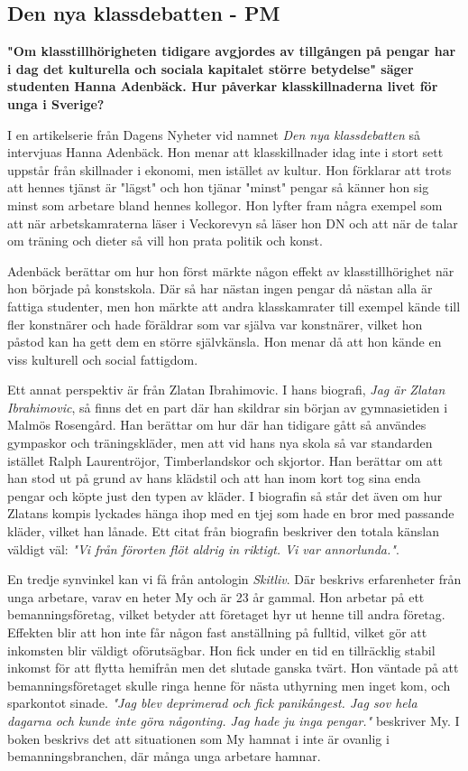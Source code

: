 \subsection{Den nya klassdebatten - PM}

\textbf{"Om klasstillhörigheten tidigare avgjordes av tillgången på pengar har i dag det kulturella och sociala kapitalet större betydelse" säger studenten Hanna Adenbäck. Hur påverkar klasskillnaderna livet för unga i Sverige?}

I en artikelserie från Dagens Nyheter vid namnet \textit{Den nya klassdebatten} så intervjuas Hanna Adenbäck. Hon menar att klasskillnader idag inte i stort sett uppstår från skillnader i ekonomi, men istället av kultur. Hon förklarar att trots att hennes tjänst är "lägst" och hon tjänar "minst" pengar så känner hon sig minst som arbetare bland hennes kollegor. Hon lyfter fram några exempel som att när arbetskamraterna läser i Veckorevyn så läser hon DN och att när de talar om träning och dieter så vill hon prata politik och konst. 

Adenbäck berättar om hur hon först märkte någon effekt av klasstillhörighet när hon började på konstskola. Där så har nästan ingen pengar då nästan alla är fattiga studenter, men hon märkte att andra klasskamrater till exempel kände till fler konstnärer och hade föräldrar som var själva var konstnärer, vilket hon påstod kan ha gett dem en större självkänsla. Hon menar då att hon kände en viss kulturell och social fattigdom.

Ett annat perspektiv är från Zlatan Ibrahimovic. I hans biografi, \textit{Jag är Zlatan Ibrahimovic}, så finns det en part där han skildrar sin början av gymnasietiden i Malmös Rosengård. Han berättar om hur där han tidigare gått så användes gympaskor och träningskläder, men att vid hans nya skola så var standarden istället Ralph Laurentröjor, Timberlandskor och skjortor. Han berättar om att han stod ut på grund av hans klädstil och att han inom kort tog sina enda pengar och köpte just den typen av kläder. I biografin så står det även om hur Zlatans kompis lyckades hänga ihop med en tjej som hade en bror med passande kläder, vilket han lånade. Ett citat från biografin beskriver den totala känslan väldigt väl: \textit{"Vi från förorten flöt aldrig in riktigt. Vi var annorlunda."}.

En tredje synvinkel kan vi få från antologin \textit{Skitliv}. Där beskrivs erfarenheter från unga arbetare, varav en heter My och är 23 år gammal. Hon arbetar på ett bemanningsföretag, vilket betyder att företaget hyr ut henne till andra företag. Effekten blir att hon inte får någon fast anställning på fulltid, vilket gör att inkomsten blir väldigt oförutsägbar. Hon fick under en tid en tillräcklig stabil inkomst för att flytta hemifrån men det slutade ganska tvärt. Hon väntade på att bemanningsföretaget skulle ringa henne för nästa uthyrning men inget kom, och sparkontot sinade. \textit{"Jag blev deprimerad och fick panikångest. Jag sov hela dagarna och kunde inte göra någonting. Jag hade ju inga pengar."} beskriver My. I boken beskrivs det att situationen som My hamnat i inte är ovanlig i bemanningsbranchen, där många unga arbetare hamnar.

